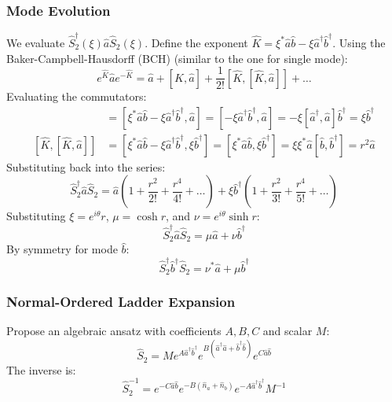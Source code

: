\subsubsection{Mode Evolution}
We evaluate $\hat{S}_2^\dagger(\xi) \hat{a} \hat{S}_2(\xi)$. Define the exponent $\hat{K} = \xi^*\hat{a}\hat{b} - \xi\hat{a}^\dagger\hat{b}^\dagger$. Using the Baker-Campbell-Hausdorff (BCH)  (similar to the one for single mode):
\begin{equation*}
e^{\hat{K}} \hat{a} e^{-\hat{K}} = \hat{a} + [\hat{K}, \hat{a}] + \frac{1}{2!}[\hat{K}, [\hat{K}, \hat{a}]] + \dots
\end{equation*}
Evaluating the commutators:
\begin{align*}
[\hat{K}, \hat{a}] &= [\xi^*\hat{a}\hat{b} - \xi\hat{a}^\dagger\hat{b}^\dagger, \hat{a}] = [-\xi\hat{a}^\dagger\hat{b}^\dagger, \hat{a}] = -\xi[\hat{a}^\dagger, \hat{a}]\hat{b}^\dagger = \xi\hat{b}^\dagger \\
[\hat{K}, [\hat{K}, \hat{a}]] &= [\xi^*\hat{a}\hat{b} - \xi\hat{a}^\dagger\hat{b}^\dagger, \xi\hat{b}^\dagger] = [\xi^*\hat{a}\hat{b}, \xi\hat{b}^\dagger] = \xi\xi^*\hat{a}[\hat{b}, \hat{b}^\dagger] = r^2\hat{a}
\end{align*}
Substituting back into the series:
\begin{equation*}
\hat{S}_2^\dagger \hat{a} \hat{S}_2 = \hat{a}\left(1 + \frac{r^2}{2!} + \frac{r^4}{4!} + \dots\right) + \xi\hat{b}^\dagger\left(1 + \frac{r^2}{3!} + \frac{r^4}{5!} + \dots\right)
\end{equation*}
Substituting $\xi = e^{i\theta}r$, $\mu = \cosh r$, and $\nu = e^{i\theta}\sinh r$:
\begin{equation}
\hat{S}_2^\dagger \hat{a} \hat{S}_2 = \mu\hat{a} + \nu\hat{b}^\dagger
\end{equation}
By symmetry for mode $\hat{b}$:
\begin{equation}
\hat{S}_2^\dagger \hat{b}^\dagger \hat{S}_2 = \nu^*\hat{a} + \mu\hat{b}^\dagger
\end{equation}

\subsubsection{Normal-Ordered Ladder Expansion}
Propose an algebraic ansatz with coefficients $A, B, C$ and scalar $M$:
\begin{equation*}
\hat{S}_2 = M e^{A\hat{a}^\dagger\hat{b}^\dagger} e^{B(\hat{a}^\dagger\hat{a} + \hat{b}^\dagger\hat{b})} e^{C\hat{a}\hat{b}}
\end{equation*}
The inverse is:
\begin{equation*}
\hat{S}_2^{-1} = e^{-C\hat{a}\hat{b}} e^{-B(\hat{n}_a + \hat{n}_b)} e^{-A\hat{a}^\dagger\hat{b}^\dagger} M^{-1}
\end{equation*}

